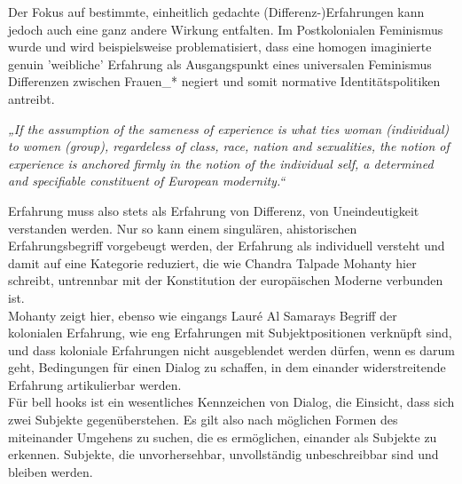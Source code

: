 Der Fokus auf bestimmte, einheitlich gedachte (Differenz-)Erfahrungen kann
jedoch auch eine ganz andere Wirkung entfalten. Im Postkolonialen Feminismus
wurde und wird beispielsweise problematisiert, dass eine homogen imaginierte
genuin 'weibliche' Erfahrung als Ausgangspunkt eines universalen Feminismus
Differenzen zwischen Frauen\_* negiert und somit normative Identitätspolitiken
antreibt.
\begin{myenv}
  \textit{
  „If the assumption of the sameness of experience is what ties woman
  (individual) to women (group), regardeless of class, race, nation and
  sexualities, the notion of experience is anchored firmly in the notion of the
  individual self, a determined and specifiable constituent of European
  modernity.“\footnotemark {}
  }
\end{myenv}
Erfahrung muss also stets als Erfahrung von Differenz, von Uneindeutigkeit
verstanden werden. Nur so kann einem singulären, ahistorischen
Erfahrungsbegriff vorgebeugt werden, der Erfahrung als individuell versteht und
damit auf eine Kategorie reduziert, die wie Chandra Talpade Mohanty hier
schreibt, untrennbar mit der Konstitution der europäischen Moderne verbunden
ist.\footnotemark{}\\

Mohanty zeigt hier, ebenso wie eingangs Lauré Al Samarays Begriff der
kolonialen Erfahrung, wie eng Erfahrungen mit Subjektpositionen verknüpft sind,
und dass koloniale Erfahrungen nicht ausgeblendet werden dürfen, wenn es darum
geht, Bedingungen für einen Dialog zu schaffen, in dem einander widerstreitende
Erfahrung artikulierbar werden.\\
Für bell hooks ist ein wesentliches Kennzeichen
von Dialog, die Einsicht, dass sich zwei Subjekte
gegenüberstehen.\footnotemark{} Es gilt
also nach möglichen Formen des miteinander Umgehens zu suchen, die es
ermöglichen, einander als Subjekte zu erkennen. Subjekte, die unvorhersehbar,
unvollständig unbeschreibbar sind und bleiben werden.\\

